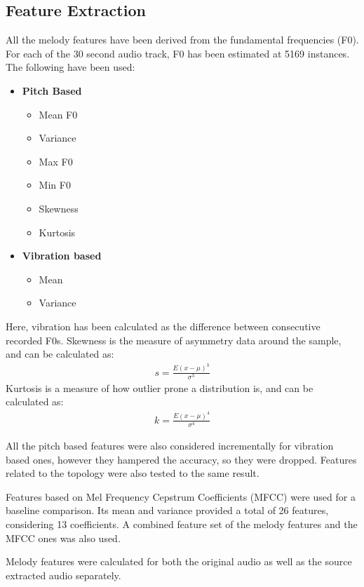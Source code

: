 \documentclass[12pt,journal,compsoc]{IEEEtran}
\begin{document}
\subsection{Feature Extraction}
\label{sec:features}
All the melody features have been derived from the fundamental frequencies (F0). For each of the 30 second audio track, F0 has been estimated at 5169 instances. The following have been used:
\begin{itemize}
\item \textbf{Pitch Based}
		\begin{itemize}
		\item Mean F0
		\item Variance
		\item Max F0
		\item Min F0
		\item Skewness
		\item Kurtosis
		\end{itemize}
\item \textbf{Vibration based}
		\begin{itemize}
		\item Mean
		\item Variance
		\end{itemize}
\end{itemize}

Here, vibration has been calculated as the difference between consecutive recorded F0s.
Skewness is the measure of asymmetry data around the sample, and can be calculated as:
\begin{align}
s = \frac{E(x - \mu)^3}{\sigma^3}
\end{align}
Kurtosis is a measure of how outlier prone a distribution is, and can be calculated as:
\begin{align}
k = \frac{E(x - \mu)^4}{\sigma^4}
\end{align}

All the pitch based features were also considered incrementally for vibration based ones, however they hampered the accuracy, so they were dropped. Features related to the topology were also tested to the same result.

Features based on Mel Frequency Cepstrum Coefficients (MFCC) were used for a baseline comparison. Its mean and variance provided a total of 26 features, considering 13 coefficients. A combined feature set of the melody features and the MFCC ones was also used.

Melody features were calculated for both the original audio as well as the source extracted audio separately.
\end{document}
